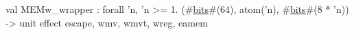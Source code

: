 val MEMw_wrapper : forall 'n, 'n >= 1. (#\hyperref[zbits]{bits}#(64), atom('n), #\hyperref[zbits]{bits}#(8 * 'n)) -> unit effect {escape, wmv, wmvt, wreg, eamem}
